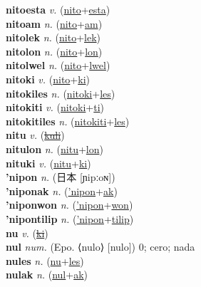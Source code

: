 \textbf{nitoesta} \textit{v.} (\hyperref[nito]{nito}+\hyperref[esta]{esta})
 \label{nitoesta} \\
\textbf{nitoam} \textit{n.} (\hyperref[nito]{nito}+\hyperref[am]{am})
 \label{nitoam} \\
\textbf{nitolek} \textit{n.} (\hyperref[nito]{nito}+\hyperref[lek]{lek})
 \label{nitolek} \\
\textbf{nitolon} \textit{n.} (\hyperref[nito]{nito}+\hyperref[lon]{lon})
 \label{nitolon} \\
\textbf{nitolwel} \textit{n.} (\hyperref[nito]{nito}+\hyperref[lwel]{lwel})
 \label{nitolwel} \\
\textbf{nitoki} \textit{v.} (\hyperref[nito]{nito}+\hyperref[ki]{ki})
 \label{nitoki} \\
\textbf{nitokiles} \textit{n.} (\hyperref[nitoki]{nitoki}+\hyperref[les]{les})
 \label{nitokiles} \\
\textbf{nitokiti} \textit{v.} (\hyperref[nitoki]{nitoki}+\hyperref[ti]{ti})
 \label{nitokiti} \\
\textbf{nitokitiles} \textit{n.} (\hyperref[nitokiti]{nitokiti}+\hyperref[les]{les})
 \label{nitokitiles} \\
\textbf{nitu} \textit{v.} (\hyperref[kuli]{\sout{kuli}})
 \label{nitu} \\
\textbf{nitulon} \textit{n.} (\hyperref[nitu]{nitu}+\hyperref[lon]{lon})
 \label{nitulon} \\
\textbf{nituki} \textit{v.} (\hyperref[nitu]{nitu}+\hyperref[ki]{ki})
 \label{nituki} \\
\textbf{'nipon} \textit{n.} ({\japanese{}日本} [ɲipːoɴ])
 \label{'nipon} \\
\textbf{'niponak} \textit{n.} (\hyperref['nipon]{'nipon}+\hyperref[ak]{ak})
 \label{'niponak} \\
\textbf{'niponwon} \textit{n.} (\hyperref['nipon]{'nipon}+\hyperref[won]{won})
 \label{'niponwon} \\
\textbf{'nipontilip} \textit{n.} (\hyperref['nipon]{'nipon}+\hyperref[tilip]{tilip})
 \label{'nipontilip} \\
\textbf{nu} \textit{v.} (\hyperref[ki]{\sout{ki}})
 \label{nu} \\
\textbf{nul} \textit{num.} (Epo. ⟨nulo⟩ [nulo])
0; cero; nada \label{nul} \\
\textbf{nules} \textit{n.} (\hyperref[nu]{nu}+\hyperref[les]{les})
 \label{nules} \\
\textbf{nulak} \textit{n.} (\hyperref[nul]{nul}+\hyperref[ak]{ak})
 \label{nulak} \\
